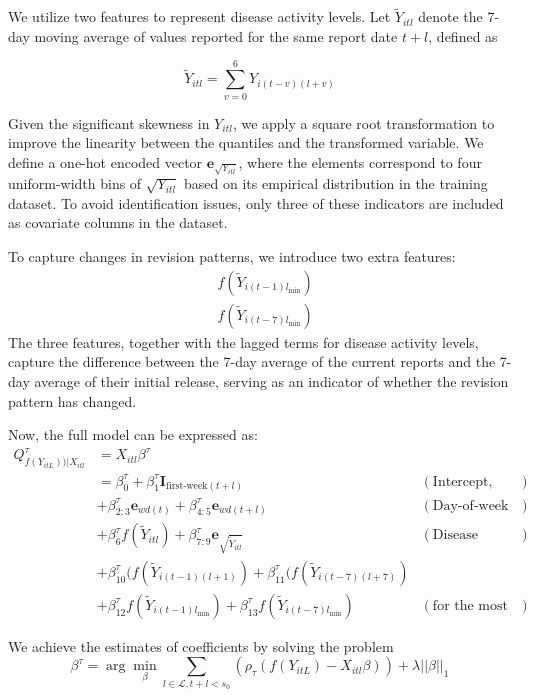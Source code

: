 We utilize two features to represent disease activity levels. Let \( \widetilde{Y}_{itl} \) denote the 7-day moving average of values reported for the same report date \( t+l \), defined as  

\[
\widetilde{Y}_{itl} = \sum_{v=0}^{6} Y_{i(t-v)(l+v)}
\]

Given the significant skewness in \( Y_{itl} \), we apply a square root transformation to improve the linearity between the quantiles and the transformed variable. We define a one-hot encoded vector \( \mathbf{e}_{\sqrt{Y_{itl}}} \), where the elements correspond to four uniform-width bins of \( \sqrt{Y_{itl}} \) based on its empirical distribution in the training dataset. To avoid identification issues, only three of these indicators are included as covariate columns in the dataset.


To capture changes in revision patterns, we introduce two extra features: 
\begin{align*} 
&f(\widetilde{Y}_{i(t-1)l_{\text{min}}}) \\
&f(\widetilde{Y}_{i(t-7)l_{\text{min}}}) 
\end{align*}
The three features, together with the lagged terms for disease activity levels, capture the difference between the 7-day average of the current reports and the 7-day average of their initial release, serving as an indicator of whether the revision pattern has changed.


Now, the full model can be expressed as:
\begin{align*} 
Q_{f(Y_{itL}))|X_{itl}}^{\tau} &=  X_{itl}\beta^{\tau}\\
& = \beta_0^{\tau}  + \beta_{1}^{\tau}\mathbf{I}_{\text{first-week}(t+l)} &(\text{Intercept, week-of-month effects})\\
& + \beta_{2:3}^{\tau}\mathbf{e}_{wd(t)} + \beta_{4:5}^{\tau}\mathbf{e}_{wd(t+l)}&(\text{Day-of-week effects}) \\ 
& + \beta_{6}^{\tau}f(\widetilde{Y}_{itl}) + \beta_{7:9}^{\tau}\mathbf{e}_{\sqrt{\widetilde{Y}_{itl}}} &(\text{Disease activity level}) \\ 
& + \beta_{10}^{\tau}(f(\widetilde{Y}_{i(t-1)(l+1)}) + \beta_{11}^{\tau}(f(\widetilde{Y}_{i(t-7)(l+7)}) \\ 
&  + \beta_{12}^{\tau}f(\widetilde{Y}_{i(t-1)l_{\text{min}}})  + \beta_{13}^{\tau}f(\widetilde{Y}_{i(t-7)l_{\text{min}}}) & (\text{for the most recent changes}) 
\end{align*}


We achieve the estimates of coefficients by solving the problem
$$ \beta^{\tau} = \arg\min_{\beta} \sum_{l\in \mathcal{L}, t+l < s_0}(\rho_\tau (f(Y_{itL}) - X_{itl}\beta)) + \lambda ||\beta||_1$$

